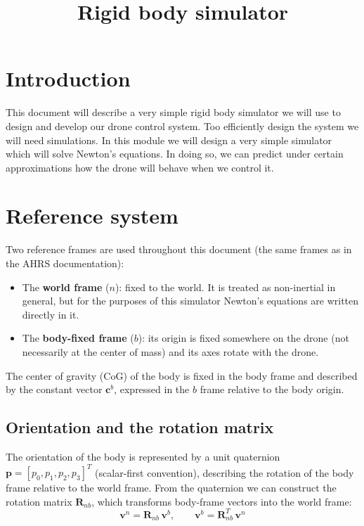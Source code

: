 \documentclass{article}
\title{Rigid body simulator}
\author{}
\date{}
\begin{document}
	
	\maketitle
	
	
	\section{Introduction}
	This document will describe a very simple rigid body simulator we will use to design and develop our drone control system. Too efficiently design the system we will need simulations. In this module we will design a very simple simulator which will solve Newton's equations. In doing so, we can predict under certain approximations how the drone will behave when we control it.
	
	\section{Reference system}

	Two reference frames are used throughout this document (the same frames as in the AHRS documentation):
	\begin{itemize}
		\item The \textbf{world frame} ($n$): fixed to the world. It is treated as non-inertial in general, but for the purposes of this simulator Newton's equations are written directly in it.
		\item The \textbf{body-fixed frame} ($b$): its origin is fixed somewhere on the drone (not necessarily at the center of mass) and its axes rotate with the drone.
	\end{itemize}

	The center of gravity (CoG) of the body is fixed in the body frame and described by the constant vector $\mathbf{c}^b$, expressed in the $b$ frame relative to the body origin.

	\subsection{Orientation and the rotation matrix}

	The orientation of the body is represented by a unit quaternion $\mathbf{p} = [p_0, p_1, p_2, p_3]^T$ (scalar-first convention), describing the rotation of the body frame relative to the world frame. From the quaternion we can construct the rotation matrix $\mathbf{R}_{nb}$, which transforms body-frame vectors into the world frame:
	\begin{equation}
		\mathbf{v}^n = \mathbf{R}_{nb} \, \mathbf{v}^b,
		\qquad
		\mathbf{v}^b = \mathbf{R}_{nb}^T \, \mathbf{v}^n
	\end{equation}
\end{document}
